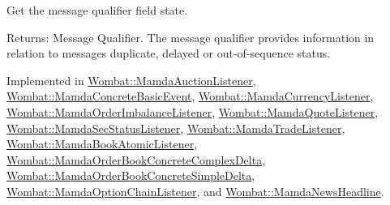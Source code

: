 Get the message qualifier field state. 

\begin{Desc}
\item[Returns:]Message Qualifier. The message qualifier provides information in relation to messages duplicate, delayed or out-of-sequence status. \end{Desc}


Implemented in \hyperlink{classWombat_1_1MamdaAuctionListener_c70e8a3a46013d656e67750a2dc83fb4}{Wombat::Mamda\-Auction\-Listener}, \hyperlink{classWombat_1_1MamdaConcreteBasicEvent_aaf1398246904234d79b25d5a5c51873}{Wombat::Mamda\-Concrete\-Basic\-Event}, \hyperlink{classWombat_1_1MamdaCurrencyListener_36f04bd57be711459aedc2857be8b621}{Wombat::Mamda\-Currency\-Listener}, \hyperlink{classWombat_1_1MamdaOrderImbalanceListener_5847f899d32947c2d9a0356733f84e78}{Wombat::Mamda\-Order\-Imbalance\-Listener}, \hyperlink{classWombat_1_1MamdaQuoteListener_84d03b5c192d75a4f5d6806028203c2e}{Wombat::Mamda\-Quote\-Listener}, \hyperlink{classWombat_1_1MamdaSecStatusListener_8765ba6f3282f63dec55b258a6c42836}{Wombat::Mamda\-Sec\-Status\-Listener}, \hyperlink{classWombat_1_1MamdaTradeListener_415c8f22e03ada875aeb985455d8fc92}{Wombat::Mamda\-Trade\-Listener}, \hyperlink{classWombat_1_1MamdaBookAtomicListener_fb7817c15ad089fe8840f16acf6a89d6}{Wombat::Mamda\-Book\-Atomic\-Listener}, \hyperlink{classWombat_1_1MamdaOrderBookConcreteComplexDelta_cf10f3c525a296a751d1b0dbf65d2a0b}{Wombat::Mamda\-Order\-Book\-Concrete\-Complex\-Delta}, \hyperlink{classWombat_1_1MamdaOrderBookConcreteSimpleDelta_9bdeef1eb97dfe5f2210fbd8b9eb0cdc}{Wombat::Mamda\-Order\-Book\-Concrete\-Simple\-Delta}, \hyperlink{classWombat_1_1MamdaOptionChainListener_55c3258edcbe570b4a68dd463b0f0f24}{Wombat::Mamda\-Option\-Chain\-Listener}, and \hyperlink{classWombat_1_1MamdaNewsHeadline_dccb147f13eb839ad4c8e69afe20c3be}{Wombat::Mamda\-News\-Headline}.